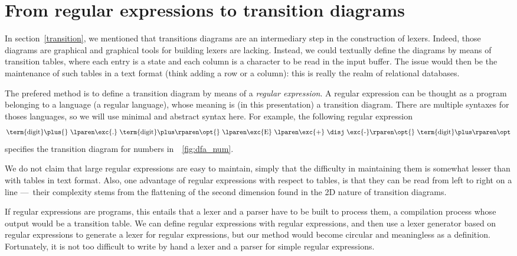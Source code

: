 \documentclass[12pt,a4paper]{article}
\begin{document}
\section{From regular expressions to transition diagrams}

In section~\vref{transition}, we mentioned that transitions diagrams
are an intermediary step in the construction of lexers. Indeed, those
diagrams are graphical and graphical tools for building lexers are
lacking. Instead, we could textually define the diagrams by means of
transition tables, where each entry is a state and each column is a
character to be read in the input buffer. The issue would then be the
maintenance of such tables in a text format (think adding a row or a
column): this is really the realm of relational databases.

The prefered method is to define a transition diagram by means of a
\emph{regular expression}. A regular expression can be thought as a
program belonging to a language (a regular language), whose meaning is
(in this presentation) a transition diagram. There are multiple
syntaxes for thoses languages, so we will use minimal and abstract
syntax here. For example, the following regular expression
\begin{align*}
\text{\term{digit}\plus{} \lparen\exc{.}
  \term{digit}\plus\rparen\opt{} \lparen\exc{E} \lparen\exc{+} \disj
  \exc{-}\rparen\opt{} \term{digit}\plus\rparen\opt}
\end{align*}
specifies the transition diagram for numbers
in~\fig~\vref{fig:dfa_num}.

We do not claim that large regular expressions are easy to maintain,
simply that the difficulty in maintaining them is somewhat lesser than
with tables in text format. Also, one advantage of regular expressions
with respect to tables, is that they can be read from left to right on
a line ---~their complexity stems from the flattening of the second
dimension found in the 2D nature of transition diagrams.

If regular expressions are programs, this entails that a lexer and a
parser have to be built to process them, a compilation process whose
output would be a transition table. We can define regular expressions
with regular expressions, and then use a lexer generator based on
regular expressions to generate a lexer for regular expressions, but
our method would become circular and meaningless as a
definition. Fortunately, it is not too difficult to write by hand a
lexer and a parser for simple regular expressions.
\end{document}
